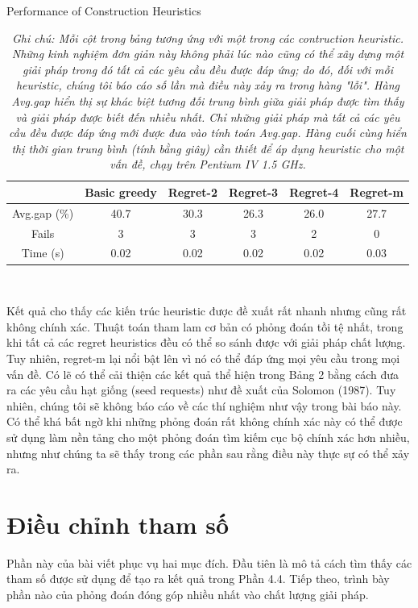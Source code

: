 \begin{table}
    \caption{Performance of Construction Heuristics}
    \begin{tabular}{c c c c c c} 
        \hline 
        & Basic greedy & Regret-2 & Regret-3 & Regret-4 & Regret-m\\ [0.5ex] 
        \hline 
        Avg.gap (\%) & 40.7 & 30.3 & 26.3 & 26.0 & 27.7 \\ 
        Fails & 3 & 3 & 3 & 2 & 0 \\
        Time (s) & 0.02 & 0.02 & 0.02 & 0.02 & 0.03 \\ [1ex] 
        \hline 
    \end{tabular}
    \\ [1ex] 
    \caption{ \textit{Ghi chú: Mỗi cột trong bảng tương ứng với một trong các contruction heuristic. Những kinh nghiệm đơn giản này không phải lúc nào cũng có thể xây dựng một giải pháp trong đó tất cả các yêu cầu đều được đáp ứng; do đó, đối với mỗi heuristic, chúng tôi báo cáo số lần mà điều này xảy ra trong hàng "lỗi". Hàng Avg.gap hiển thị sự khác biệt tương đối trung bình giữa giải pháp được tìm thấy và giải pháp được biết đến nhiều nhất. Chỉ những giải pháp mà tất cả các yêu cầu đều được đáp ứng mới được đưa vào tính toán Avg.gap. Hàng cuối cùng hiển thị thời gian trung bình (tính bằng giây) cần thiết để áp dụng heuristic cho một vấn đề, chạy trên Pentium IV 1.5 GHz.}}
\end{table}

Kết quả cho thấy các kiến trúc heuristic được đề xuất rất nhanh nhưng cũng rất không chính xác. Thuật toán tham lam cơ bản có phỏng đoán tồi tệ nhất, trong khi tất cả các regret heuristics đều có thể so sánh được với giải pháp chất lượng. Tuy nhiên, regret-m lại nổi bật lên vì nó có thể đáp ứng mọi yêu cầu trong mọi vấn đề. Có lẽ có thể cải thiện các kết quả thể hiện trong Bảng 2 bằng cách đưa ra các yêu cầu hạt giống (seed requests) như đề xuất của Solomon (1987). Tuy nhiên, chúng tôi sẽ không báo cáo về các thí nghiệm như vậy trong bài báo này. Có thể khá bất ngờ khi những phỏng đoán rất không chính xác này có thể được sử dụng làm nền tảng cho một phỏng đoán tìm kiếm cục bộ chính xác hơn nhiều, nhưng như chúng ta sẽ thấy trong các phần sau rằng điều này thực sự có thể xảy ra.


\section{Điều chỉnh tham số}
Phần này của bài viết phục vụ hai mục đích. Đầu tiên là mô tả cách tìm thấy các tham số được sử dụng để tạo ra kết quả trong Phần 4.4. Tiếp theo, trình bày phần nào của phỏng đoán đóng góp nhiều nhất vào chất lượng giải pháp.

